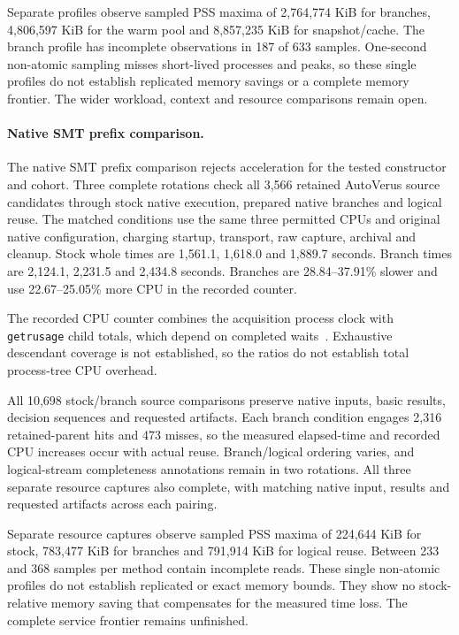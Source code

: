 \documentclass[10pt,twocolumn]{article}
\begin{document}
Separate profiles observe sampled PSS maxima of 2,764,774 KiB for branches,
4,806,597 KiB for the warm pool and 8,857,235 KiB for snapshot/cache.
The branch profile has incomplete observations in 187 of 633 samples.
One-second non-atomic sampling misses short-lived processes and peaks, so
these single profiles do not establish replicated memory savings or a complete
memory frontier. The wider workload, context and resource comparisons remain open.

\paragraph{Native SMT prefix comparison.}
The native SMT prefix comparison rejects acceleration for the tested constructor
and cohort.
Three complete rotations check all 3,566 retained AutoVerus source candidates
through stock native execution, prepared native branches and logical reuse.
The matched conditions use the same three permitted CPUs and original native
configuration, charging startup, transport, raw capture, archival and cleanup.
Stock whole times are 1,561.1, 1,618.0 and 1,889.7 seconds. Branch times are
2,124.1, 2,231.5 and 2,434.8 seconds. Branches are 28.84--37.91\% slower and
use 22.67--25.05\% more CPU in the recorded counter.

The recorded CPU counter combines the acquisition process clock with
\texttt{getrusage} child totals, which depend on completed waits~\cite{getrusage}.
Exhaustive descendant coverage is not established, so the ratios do not
establish total process-tree CPU overhead.

All 10,698 stock/branch source comparisons preserve native inputs, basic
results, decision sequences and requested artifacts. Each branch condition
engages 2,316 retained-parent hits and 473 misses, so the measured elapsed-time and recorded CPU increases occur with
actual reuse. Branch/logical ordering varies, and logical-stream completeness
annotations remain in two rotations. All three separate resource captures also
complete, with matching native input, results and requested artifacts across
each pairing.

Separate resource captures observe sampled PSS maxima of 224,644 KiB for stock,
783,477 KiB for branches and 791,914 KiB for logical reuse.
Between 233 and 368 samples per method contain incomplete reads.
These single non-atomic profiles do not establish replicated or exact memory
bounds. They show no stock-relative memory saving that compensates for the
measured time loss. The complete service frontier remains unfinished.
\end{document}
